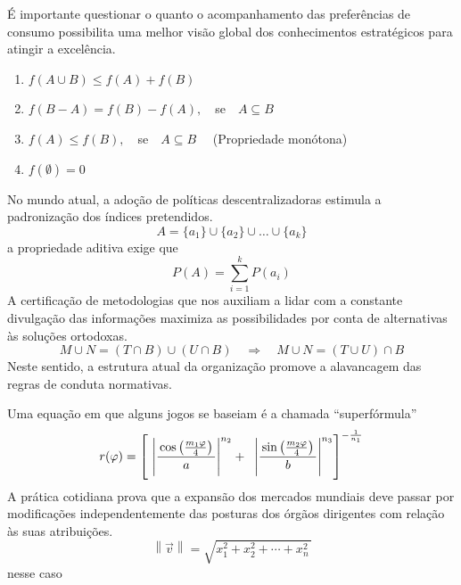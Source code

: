 \begin{apendicesenv}
    É importante questionar o quanto o
    acompanhamento das preferências de consumo possibilita uma melhor visão global
    dos conhecimentos estratégicos para atingir a excelência.
    \begin{enumerate}[label=\alph*)]
        \item $f(A\cup B)\leq f(A)+f(B)$
        \item $f(B-A)=f(B)-f(A), \quad $se$\quad A\subseteq B$
        \item $f(A)\leq f(B), \quad $se$\quad A\subseteq B \quad$ (Propriedade monótona)
        \item $f(\emptyset)=0$
    \end{enumerate}
    No mundo atual, a
    adoção de políticas descentralizadoras estimula a padronização dos índices
    pretendidos.
    \[
        A = \{a_{1}\} \cup \{a_{2}\} \cup \dots \cup \{a_{k} \}
    \]
    a propriedade aditiva exige que
    \[
        P(A) = \sum_{i=1}^{k} P({a_{i}})
    \]
    A certificação de metodologias que nos auxiliam a lidar com a
    constante divulgação das informações maximiza as possibilidades por conta de
    alternativas às soluções ortodoxas.
    \[
        M \cup N = (T \cap B) \cup (U \cap B)
        \quad
        \Rightarrow
        \quad
        M \cup N = (T \cup U) \cap B
    \]
    Neste sentido, a estrutura atual da organização promove a alavancagem das regras
    de conduta normativas.

    Uma equação em que alguns jogos se baseiam é a chamada ``superfórmula''
    \[
        r( \varphi )=
        \left [\,
        \vphantom{\begin{array}{c}1\\2\\3\\\end{array}}
        \left|
        \frac{\,\cos\left( \frac{m_1\varphi }{4} \right)\,}{a}
        \right|^{n_2} + \;\;
        \left|
        \frac{\,\sin\left( \frac{m_2\varphi }{4} \right)\,}{b}
        \right|^{n_3}
        \right]^{-\frac{1}{n_1}}
    \]
    A prática cotidiana prova que a expansão dos mercados
    mundiais deve passar por modificações independentemente das posturas dos órgãos
    dirigentes com relação às suas atribuições.
    \[
        \left\| \vec{v} \right\| = \sqrt{ x_{1}^{2} + x_{2}^{2} + \cdots + x_{n}^{2} \,}
    \]
    nesse caso


\end{apendicesenv}
